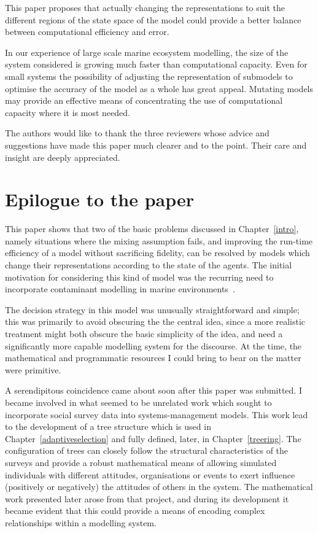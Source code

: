 This paper proposes that actually changing the representations to suit the
different regions of the state space of the model could provide a better
balance between computational efficiency and error.

In our experience of large scale marine ecosystem modelling, the size of the
system considered is growing much faster than computational capacity. Even for
small systems the possibility of adjusting the representation of submodels to
optimise the accuracy of the model as a whole has great appeal. Mutating
models may provide an effective means of concentrating the use of
computational capacity where it is most needed.


The authors would like to thank the three reviewers whose advice and
suggestions have made this paper much clearer and to the point. Their care and
insight are deeply appreciated.
\pagebreak

\section{Epilogue to the paper}

This paper shows that two of the basic problems discussed in Chapter~\ref{intro},
namely situations where the mixing assumption fails, and improving the
run-time efficiency of a model without sacrificing fidelity, can be
resolved by models which change their representations according to the
state of the agents.  The
initial motivation for considering this kind of model was the
recurring need to incorporate contaminant modelling in marine
environments~\cite{lyne1994pmez5, gray2006nws, grayningaloo}. 

The decision strategy in this model was unusually straightforward and
simple; this was primarily to avoid obscuring the the central idea,
since a more realistic treatment might both obscure the basic
simplicity of the idea, and need a significantly more capable
modelling system for the discourse.  At the time, the mathematical and
programmatic resources I could bring to bear on the matter were
primitive.

A serendipitous coincidence came about soon after this paper was
submitted. I became involved in what seemed to be unrelated work which
sought to incorporate social survey data into systems-management
models. This work lead to the development of a tree structure which is
used in Chapter~\ref{adaptiveselection} and fully defined, later, in
Chapter~\ref{treering}. The configuration of trees can closely follow
the structural characteristics of the surveys and provide a robust
mathematical means of allowing simulated individuals with different
attitudes, organisations or events to exert influence (positively or
negatively) the attitudes of others in the system.  The mathematical
work presented later arose from that project, and during its
development it became evident that this could provide a means of
encoding complex relationships within a modelling system.







